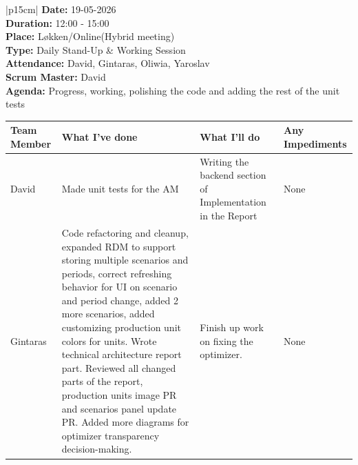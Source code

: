 \begin{table}[H]
    \centering
    \begin{tabular}{|p{15cm}|}   
        \hline
        \textbf{Date:}  19-05-2026 \\
        \textbf{Duration:} 12:00 - 15:00 \\
        \textbf{Place:}  Løkken/Online(Hybrid meeting) \\
        \textbf{Type:} Daily Stand-Up \& Working Session \\
        \textbf{Attendance:} David, Gintaras, Oliwia, Yaroslav \\
        \textbf{Scrum Master:}  David \\
        \textbf{Agenda:} Progress, working, polishing the code and adding the rest of the unit tests 
        \begin{table}[H]
            \begin{tabular}{|p{1.75cm}|p{4cm}|p{4cm}|p{4cm}|}
                \hline
                \cellcolor[HTML]{BFBFBF}  \textbf{Team Member} & \cellcolor[HTML]{BFBFBF}  \textbf{What I've done} & \cellcolor[HTML]{BFBFBF}  \textbf{What I'll do} & \cellcolor[HTML]{BFBFBF}  \textbf{Any Impediments}\\
                \hline
                \cellcolor[HTML]{d4d4d4} David & Made unit tests for the AM & Writing the backend section of Implementation in the Report & None \\
                \hline
                \cellcolor[HTML]{d4d4d4} Gintaras & Code refactoring and cleanup, expanded RDM to support storing multiple scenarios and periods, correct refreshing behavior for UI on scenario and period change, added 2 more scenarios, added customizing production unit colors for units. Wrote technical architecture report part. Reviewed all changed parts of the report, production units image PR and scenarios panel update PR. Added more diagrams for optimizer transparency decision-making. & Finish up work on fixing the optimizer. & None \\
                \hline
            \end{tabular}
        \end{table} \\
        \hline
    \end{tabular}
\end{table}

